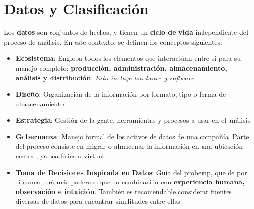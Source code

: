 \section{Datos y Clasificación}
Los \textbf{datos} son conjuntos de hechos, y tienen un \textbf{ciclo de vida} independiente del proceso de análisis. En este contexto, se definen los conceptos siguientes:

\begin{itemize}
    \item {\textbf{Ecosistema}: Engloba todos los elementos que interactúan entre si para su manejo completo: \textbf{producción, administración, almacenamiento, análisis y distribución}. \textit{Esto incluye hardware y software}}
    \item {\textbf{Diseño}: Organización de la información por formato, tipo o forma de almacenamiento}
    \item {\textbf{Estrategia}: Gestión de la gente, herramientas y procesos a usar en el análisis}
    \item {\textbf{Gobernanza}: Manejo formal de los activos de datos de una compañía. Parte del proceso consiste en migrar o almacenar la información en una ubicación central, ya sea física o virtual}
    \item {\textbf{Toma de Decisiones Inspirada en Datos}: Guía del \gls{probemp}, que de por si nunca será más poderoso que su combinación con \textbf{experiencia humana, observación e intuición}. También es recomendable considerar fuentes diversas de datos para encontrar similitudes entre ellas}    
\end{itemize} 

